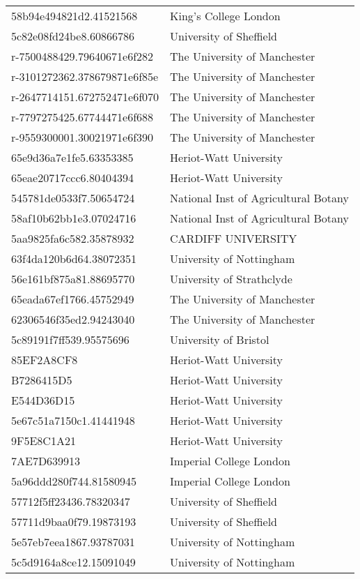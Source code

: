 \begin{tabular}{ll}
58b94e494821d2.41521568 & King's College London \\
5c82e08fd24be8.60866786 & University of Sheffield \\
r-7500488429.79640671e6f282 & The University of Manchester \\
r-3101272362.378679871e6f85e & The University of Manchester \\
r-2647714151.672752471e6f070 & The University of Manchester \\
r-7797275425.67744471e6f688 & The University of Manchester \\
r-9559300001.30021971e6f390 & The University of Manchester \\
65e9d36a7e1fe5.63353385 & Heriot-Watt University \\
65eae20717ccc6.80404394 & Heriot-Watt University \\
545781de0533f7.50654724 & National Inst of Agricultural Botany \\
58af10b62bb1e3.07024716 & National Inst of Agricultural Botany \\
5aa9825fa6c582.35878932 & CARDIFF UNIVERSITY \\
63f4da120b6d64.38072351 & University of Nottingham \\
56e161bf875a81.88695770 & University of Strathclyde \\
65eada67ef1766.45752949 & The University of Manchester \\
62306546f35ed2.94243040 & The University of Manchester \\
5c89191f7ff539.95575696 & University of Bristol \\
85EF2A8CF8 & Heriot-Watt University \\
B7286415D5 & Heriot-Watt University \\
E544D36D15 & Heriot-Watt University \\
5e67c51a7150c1.41441948 & Heriot-Watt University \\
9F5E8C1A21 & Heriot-Watt University \\
7AE7D639913 & Imperial College London \\
5a96ddd280f744.81580945 & Imperial College London \\
57712f5ff23436.78320347 & University of Sheffield \\
57711d9baa0f79.19873193 & University of Sheffield \\
5e57eb7eea1867.93787031 & University of Nottingham \\
5c5d9164a8ce12.15091049 & University of Nottingham \\

\end{tabular}
